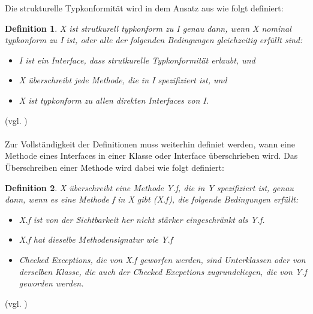 \documentclass[11pt, 
ngerman,
doublespacing,
chapterinoneline, %
consistentlayout, %
]{scrartcl}
\newtheorem{definition}{Definition}
\begin{document}
Die strukturelle Typkonformität wird in dem Ansatz aus \cite{structconfjava} wie folgt definiert:
\begin{definition}\label{def_structTypkonfJava}
\emph{X} ist strutkurell typkonform zu \emph{I} genau dann, wenn \emph{X} nominal typkonform zu \emph{I} ist, oder alle der folgenden Bedingungen gleichzeitig erfüllt sind:
\begin{itemize}
\item \emph{I} ist ein Interface, dass strutkurelle Typkonformität erlaubt, und
\item \emph{X} überschreibt jede Methode, die in \emph{I} spezifiziert ist, und
\item \emph{X} ist typkonform zu allen direkten Interfaces von \emph{I}.
\end{itemize}
\end{definition} (vgl. \cite{structconfjava})\\\\
Zur Vollständigkeit der Definitionen muss weiterhin definiet werden, wann eine Methode eines Interfaces in einer Klasse oder Interface überschrieben wird. Das Überschreiben einer Methode wird dabei wie folgt definiert:
\begin{definition}\label{def_override}
\emph{X} überschreibt eine Methode \emph{Y.f}, die in \emph{Y} spezifiziert ist, genau dann, wenn es eine Methode \emph{f} in \emph{X} gibt (\emph{X.f}), die folgende Bedingungen erfüllt:
\begin{itemize}
\item \emph{X.f} ist von der Sichtbarkeit her nicht stärker eingeschränkt als \emph{Y.f}.
\item \emph{X.f} hat dieselbe Methodensignatur wie \emph{Y.f}
\item Checked Exceptions, die von \emph{X.f} geworfen werden, sind Unterklassen oder von derselben Klasse, die auch der Checked Excpetions zugrundeliegen, die von \emph{Y.f} geworden werden.
\end{itemize}
\end{definition} (vgl. \cite{structconfjava})\\\\
\end{document}
